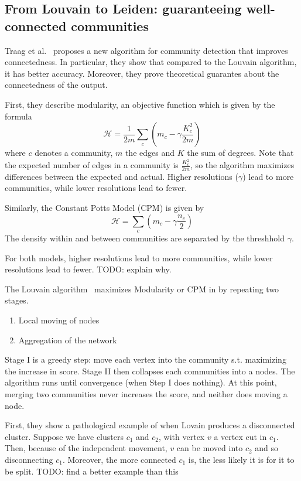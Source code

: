 \documentclass[../../main/main.tex]{subfiles}
\begin{document}
\subsection*{From Louvain to Leiden: guaranteeing well-connected communities}

Traag et al.~\cite{traag19-03} proposes a new algorithm for community detection that improves connectedness.
In particular, they show that compared to the Louvain algorithm, it has better accuracy.
Moreover, they prove theoretical guarantes about the connectedness of the output.

First, they describe modularity, an objective function which is given by the formula
$$
	\mathscr{H} = \frac{1}{2m} \sum_c \left( m_c - \gamma \frac{K_c^2}{2m} \right)
$$
where $c$ denotes a community, $m$ the edges and $K$ the sum of degrees.
Note that the expected number of edges in a community is $\frac{K_c^2}{2m}$, so the algorithm maximizes differences between the expected and actual.
Higher resolutions ($\gamma$) lead to more communities, while lower resolutions lead to fewer.

Similarly, the Constant Potts Model (CPM) is given by
$$
	\mathscr{H} = \sum_c \left( m_c - \gamma \frac{n_c}{2} \right)
$$
The density within and between communities are separated by the threshhold $\gamma$.

For both models, higher resolutions lead to more communities, while lower resolutions lead to fewer.
TODO: explain why.

The Louvain algorithm~\cite{blondel08-10} maximizes Modularity or CPM in by repeating two stages.
\begin{enumerate}
	\item Local moving of nodes
	\item Aggregation of the network
\end{enumerate}
Stage I is a greedy step: move each vertex into the community s.t. maximizing the increase in score.
Stage II then collapses each communities into a nodes.
The algorithm runs until convergence (when Step I does nothing).
At this point, merging two communities never increases the score, and neither does moving a node.

First, they show a pathological example of when Lovain produces a disconnected cluster.
Suppose we have clusters $c_1$ and $c_2$, with vertex $v$ a vertex cut in $c_1$.
Then, because of the independent movement, $v$ can be moved into $c_2$ and so disconnecting $c_1$.
Moreover, the more connected $c_1$ is, the less likely it is for it to be split.
TODO: find a better example than this
\end{document}
